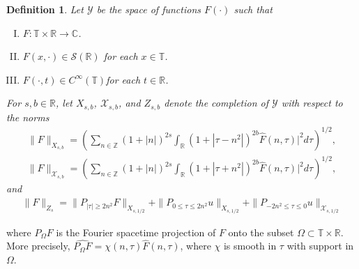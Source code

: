 \documentclass[12pt,reqno]{amsart}
\numberwithin{equation}{section}  %
\newcommand{\rr}{\mathbb{R}}
\newcommand{\zz}{\mathbb{Z}}
\newcommand{\cc}{\mathbb{C}}
\newcommand{\ci}{\mathbb{T}}
\newcommand{\wh}{\widehat}
\newtheorem{definition}[theorem]{Definition}
\newtheorem{remark}[theorem]{Remark}
\begin{document}
\begin{definition}
  Let $\mathcal{Y}$ be the space of functions $F(\cdot)$ such that
  \begin{enumerate}[(I)]
   \item{$F: \ci \times \rr \to \cc$}.
   \item{$F(x, \cdot) \in \mathcal{S}(\rr)$ for each $x \in \ci$}.
   \item{$F(\cdot, t) \in C^{\infty}(\ci)$for each $t \in \rr$}.
  \end{enumerate}
  For $s, b \in \rr$, let $X_{s,b}$, $\mathcal{X}_{s,b}$, and $Z_{s,b}$ denote the completion of $\mathcal{Y}$ with
  respect to the norms
  \begin{equation}
  \begin{split}
    \|F\|_{X_{s,b}} = \left( \sum_{n \in \zz} (1 + |n|)^{2s} \int_{\rr}
    (1 + |\tau - n^{2} |)^{2b} \wh{F}(n, \tau)|^{2} d \tau\right)^{1/2},
  \end{split}
  \end{equation}
  \begin{equation}
  \begin{split}
    \|F\|_{\mathcal{X}_{s,b}} = \left( \sum_{n \in \zz} (1 + |n|)^{2s} \int_{\rr}
    (1 + |\tau + n^{2} |)^{2b} \wh{F}(n, \tau)|^{2} d \tau\right)^{1/2},
  \end{split}
  \end{equation}
  and
  \begin{gather*}
    \|F\|_{Z_{s}} = \|P_{| \tau| \ge 2n^{2}}F\|_{X_{s,1/2}} + \| P_{0 \le \tau \le 2n^{2}} u
    \|_{X_{s,1/2}}
    + \| P_{-2n^2 \le \tau \le 0} u  \|_{\mathcal{X}_{s,1/2}}  
  \end{gather*}
\end{definition}
%
where $P_{\Omega} F$ is the Fourier spacetime projection of $F$ onto the subset $\Omega \subset \ci \times \rr$. More precisely, $\wh{P_{\Omega}F} = \chi(n, \tau)\wh{F}(n, \tau)$, where $\chi$ is smooth in $\tau$ with support in $\Omega$.  
%
\end{document}
